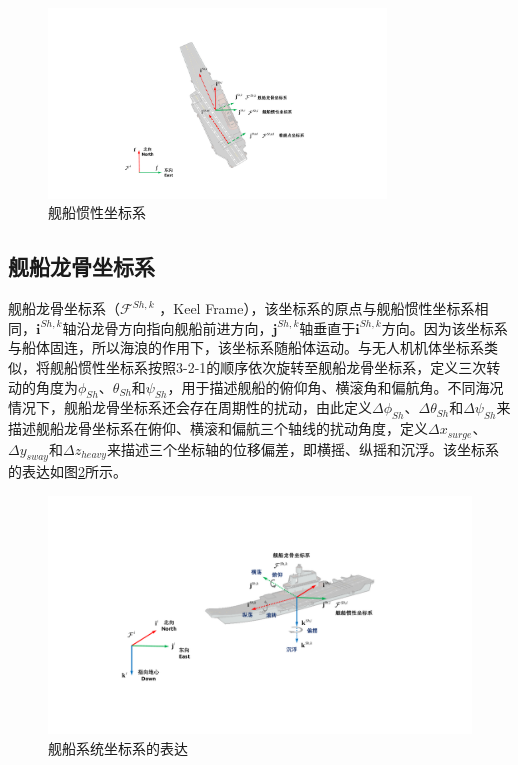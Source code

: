 \begin{figure}[htb]   
	\centering
	\includegraphics[width=0.8\textwidth]{figs/chp02/chp02_08_ship_interial_frame.pdf}
	\caption{舰船惯性坐标系}
	\label{fig:chp02_08_ship_interial_frame}
\end{figure}

\subsection{舰船龙骨坐标系}
舰船龙骨坐标系（$\mathcal{F}^{Sh,k}$ ，Keel Frame），该坐标系的原点与舰船惯性坐标系相同，$\mathbf{i}^{Sh,k}$轴沿龙骨方向指向舰船前进方向，$\mathbf{j}^{Sh,k}$轴垂直于$\mathbf{i}^{Sh,k}$方向。因为该坐标系与船体固连，所以海浪的作用下，该坐标系随船体运动。与无人机机体坐标系类似，将舰船惯性坐标系按照3-2-1的顺序依次旋转至舰船龙骨坐标系，定义三次转动的角度为$\phi_{Sh}$、$\theta_{Sh}$和$\psi_{Sh}$，用于描述舰船的俯仰角、横滚角和偏航角。不同海况情况下，舰船龙骨坐标系还会存在周期性的扰动，由此定义$\Delta \phi_{Sh}$、$\Delta \theta_{Sh}$和$\Delta \psi_{Sh}$来描述舰船龙骨坐标系在俯仰、横滚和偏航三个轴线的扰动角度，定义$\Delta x_{surge}$、$\Delta y_{sway}$和$\Delta z_{heavy}$来描述三个坐标轴的位移偏差，即横摇、纵摇和沉浮。该坐标系的表达如图\ref{fig:chp02_09_ship_motion_frame}所示。

\begin{figure}[htb]   
	\centering
	\includegraphics[width=\textwidth]{figs/chp02/chp02_09_ship_motion_frame.pdf}
	\caption{舰船系统坐标系的表达}
	\label{fig:chp02_09_ship_motion_frame}
\end{figure}



